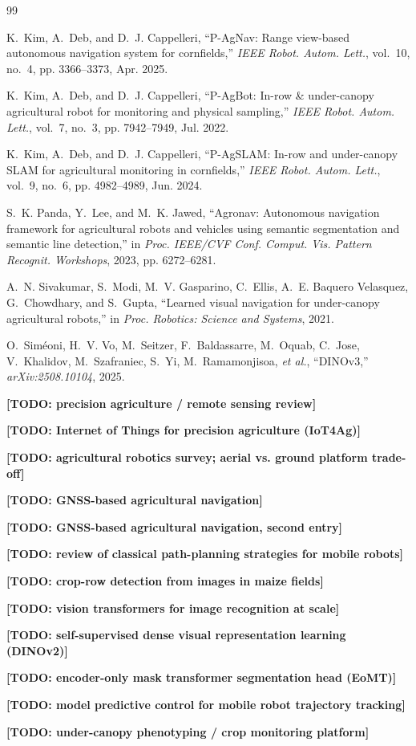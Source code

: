 \documentclass[conference]{IEEEtran}
\newcommand{\TODO}[1]{\textbf{[TODO: #1]}}
\begin{document}
\begin{thebibliography}{99}

K.~Kim, A.~Deb, and D.~J. Cappelleri, ``P-AgNav: Range view-based autonomous
navigation system for cornfields,'' \emph{IEEE Robot. Autom. Lett.}, vol.~10,
no.~4, pp. 3366--3373, Apr. 2025.

K.~Kim, A.~Deb, and D.~J. Cappelleri, ``P-AgBot: In-row \& under-canopy
agricultural robot for monitoring and physical sampling,'' \emph{IEEE Robot.
Autom. Lett.}, vol.~7, no.~3, pp. 7942--7949, Jul. 2022.

K.~Kim, A.~Deb, and D.~J. Cappelleri, ``P-AgSLAM: In-row and under-canopy SLAM
for agricultural monitoring in cornfields,'' \emph{IEEE Robot. Autom. Lett.},
vol.~9, no.~6, pp. 4982--4989, Jun. 2024.

S.~K. Panda, Y.~Lee, and M.~K. Jawed, ``Agronav: Autonomous navigation framework
for agricultural robots and vehicles using semantic segmentation and semantic
line detection,'' in \emph{Proc. IEEE/CVF Conf. Comput. Vis. Pattern Recognit.
Workshops}, 2023, pp. 6272--6281.

A.~N. Sivakumar, S.~Modi, M.~V. Gasparino, C.~Ellis, A.~E. Baquero Velasquez,
G.~Chowdhary, and S.~Gupta, ``Learned visual navigation for under-canopy
agricultural robots,'' in \emph{Proc. Robotics: Science and Systems}, 2021.

O.~Sim\'{e}oni, H.~V. Vo, M.~Seitzer, F.~Baldassarre, M.~Oquab, C.~Jose,
V.~Khalidov, M.~Szafraniec, S.~Yi, M.~Ramamonjisoa, \emph{et al.}, ``DINOv3,''
\emph{arXiv:2508.10104}, 2025.

\TODO{precision agriculture / remote sensing review}

\TODO{Internet of Things for precision agriculture (IoT4Ag)}

\TODO{agricultural robotics survey; aerial vs. ground platform trade-off}

\TODO{GNSS-based agricultural navigation}

\TODO{GNSS-based agricultural navigation, second entry}

\TODO{review of classical path-planning strategies for mobile robots}

\TODO{crop-row detection from images in maize fields}

\TODO{vision transformers for image recognition at scale}

\TODO{self-supervised dense visual representation learning (DINOv2)}

\TODO{encoder-only mask transformer segmentation head (EoMT)}

\TODO{model predictive control for mobile robot trajectory tracking}

\TODO{under-canopy phenotyping / crop monitoring platform}

\end{thebibliography}
\end{document}
